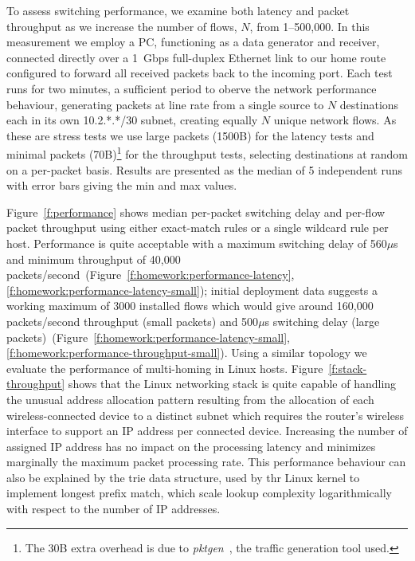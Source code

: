 To assess switching performance, we examine both latency and packet throughput
as we increase the number of flows, $N$, from 1--500,000. In this measurement we
employ a PC, functioning as a data generator and receiver, connected directly
over a 1~Gbps full-duplex Ethernet link to our home route configured to forward all
received packets back to the incoming port. 
Each test runs for two minutes, a sufficient period to oberve the network
performance behaviour, generating packets at line rate from a single
source to $N$ destinations each in its own 10.2.*.*/30 subnet, creating equally
$N$ unique network flows.  As these are stress tests we use large packets
(1500B) for the latency tests and minimal packets (70B)\footnote{The 30B extra
  overhead is due to \emph{pktgen}~, the
  traffic generation tool used.} for the throughput tests, selecting
destinations at random on a per-packet basis.  Results are presented as the
median of 5 independent runs with error bars giving the min and max values. 

Figure~\ref{f:performance} shows median per-packet switching delay and per-flow
packet throughput using either exact-match rules or a single wildcard rule per
host.  Performance is quite acceptable with a maximum switching delay of
560$\mu$s and minimum throughput of 40,000
packets/second~(Figure~\ref{f:homework:performance-latency},\ref{f:homework:performance-latency-small});
initial deployment data suggests a working maximum of 3000 installed flows which
would give around 160,000 packets/second throughput (small packets) and
500$\mu$s switching delay (large
packets)~(Figure~\ref{f:homework:performance-latency-small},\ref{f:homework:performance-throughput-small}).
Using a similar topology we evaluate the performance of multi-homing in Linux hosts.
Figure~\ref{f:stack-throughput} shows that the Linux
networking stack is quite capable of handling the unusual address allocation
pattern resulting from the allocation of each wireless-connected device to a
distinct subnet which requires the router's wireless interface to support an IP
address per connected device. Increasing the number of assigned IP address has
no impact on the processing latency and minimizes marginally the maximum packet
processing rate. This performance behaviour can also be explained by the trie
data structure, used by thr Linux kernel to implement longest prefix match, which scale
lookup complexity logarithmically with respect to the number of IP addresses. 

